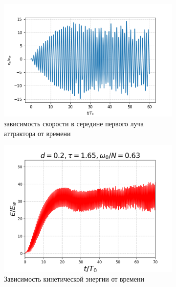 \begin{figure}
\begin{subfigure}[с]{0.45\textwidth}
	\end{subfigure}
	\par
	\begin{subfigure}[с]{0.45\textwidth}
	    \includegraphics[width=1\textwidth]{pics/H40L60N1ap10dp20w0p63/vyX35p6Y11p3t1200.png}
	    \caption{зависимость скорости в середине первого луча аттрактора от времени}
	\end{subfigure}
	\begin{subfigure}[с]{0.45\textwidth}
	    \includegraphics[width=1\textwidth]{pics/H40L60N1ap10dp20w0p63/2D36x36DiagramH40L60N1ap10dp20w0p63totKEnonDim.png}
	    \caption{Зависимость кинетической энергии от времени}
	\end{subfigure}
	\par
	\begin{subfigure}[с]{0.45\textwidth}

\end{subfigure}
\end{figure}
